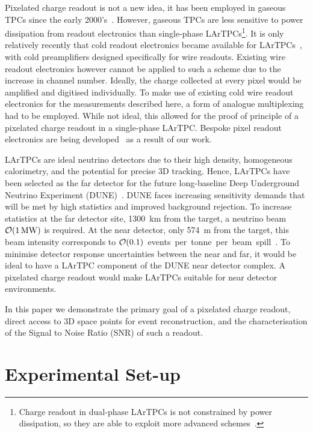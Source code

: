 \documentclass[a4paper]{article}
\begin{document}
Pixelated charge readout is not a new idea, it has been employed in gaseous TPCs since the early 2000's~\cite{gaspix}. 
However, gaseous TPCs are less sensitive to power dissipation from readout electronics than single-phase LArTPCs\footnote{Charge readout in dual-phase LArTPCs is not constrained by power dissipation, so they are able to exploit more advanced schemes~\cite{Far_Detectors}.}. 
It is only relatively recently that cold readout electronics became available for LArTPCs~\cite{larasic}, with cold preamplifiers designed specifically for wire readouts.  
Existing wire readout electronics however cannot be applied to such a scheme due to the increase in channel number.  
Ideally, the charge collected at every pixel would be amplified and digitised individually.
To make use of existing cold wire readout electronics for the measurements described here, a form of analogue multiplexing had to be employed. 
While not ideal, this allowed for the proof of principle of a pixelated charge readout in a single-phase LArTPC.   
Bespoke pixel readout electronics are being developed~\cite{larpix} as a result of our work.

LArTPCs are ideal neutrino detectors due to their high density, homogeneous calorimetry, and the potential for precise 3D tracking.
Hence, LArTPCs have been selected as the far detector for the future long-baseline Deep Underground Neutrino Experiment (DUNE)~\cite{DUNE}.  
DUNE faces increasing sensitivity demands that will be met by high statistics and improved background rejection. 
To increase statistics at the far detector site, \SI{1300}{\kilo\metre} from the target, a neutrino beam $\order{\SI{1}{\mega\watt}}$ is required.
At the near detector, only \SI{574}{\metre} from the target, this beam intensity corresponds to $\order{0.1}$~events~per~tonne~per~beam~spill~\cite{DUNE2,DUNE3}.
To minimise detector response uncertainties between the near and far, it would be ideal to have a LArTPC component of the DUNE near detector complex.
A pixelated charge readout would make LArTPCs suitable for near detector environments.

In this paper we demonstrate the primary goal of a pixelated charge readout, direct access to 3D space points for event reconstruction, and the characterisation of the Signal to Noise Ratio (SNR) of such a readout. 

\section{Experimental Set-up}
\end{document}

